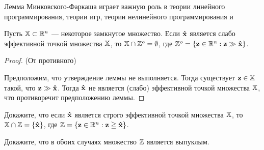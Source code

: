 
Лемма Минковского-Фаркаша играет важную роль в теории линейного
программирования, теории игр, теории нелинейного программирования и






\begin{lem}

Пусть $\mathbb{X} \subset \mathbb{R}^n$ --- некоторое замкнутое множество. Если
$\mathbf{\hat x}$ является слабо эффективной точкой множества $\mathbb{X}$,
то $\mathbb{X} \cap \mathbb{Z}^o=\emptyset$, где $\mathbb{Z}^o=\{\mathbf{z} \in
\mathbb{R}^n: \mathbf{z} \gg \mathbf{\hat x}\}$.\end{lem}

\begin{proof}(От противного)

Предположим, что утверждение леммы не выполняется. Тогда существует
$\mathbf{z} \in \mathbb{X}$ такой, что $\mathbf{z} \gg \mathbf{\hat x}$. Тогда
$\mathbf{\hat x}$ не является (слабо) эффективной точкой множества
$\mathbb{X}$, что противоречит предположению леммы.

\end{proof}

\begin{exer}
Докажите, что если  $\mathbf{\hat x}$ является строго эффективной точкой
множества $\mathbb{X}$, то $\mathbb{X} \cap \mathbb{Z}=\{\mathbf{\hat x}\}$, где
$\mathbb{Z}=\{\mathbf{z}\in \mathbb{R}^n: \mathbf{z} \geqq \mathbf{\hat x}\}$.
\end{exer}

\begin{exer}
Докажите, что в обоих случаях множество $\mathbb{Z}$ является выпуклым.
\end{exer}
